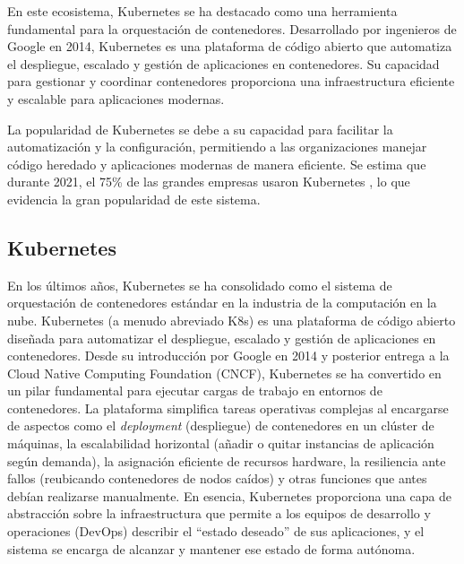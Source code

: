 \documentclass[12pt,twoside,titlepage]{report}
\begin{document}
En este ecosistema, Kubernetes se ha destacado como una herramienta fundamental para la orquestación de contenedores. Desarrollado por ingenieros de Google en 2014, Kubernetes es una plataforma de código abierto que automatiza el despliegue, escalado y gestión de aplicaciones en contenedores. Su capacidad para gestionar y coordinar contenedores proporciona una infraestructura eficiente y escalable para aplicaciones modernas. 

La popularidad de Kubernetes se debe a su capacidad para facilitar la automatización y la configuración, permitiendo a las organizaciones manejar código heredado y aplicaciones modernas de manera eficiente. Se estima que durante 2021, el 75\% de las grandes empresas usaron Kubernetes \cite{uso_kubernetes_grandes_empresas}, lo que evidencia la gran popularidad de este sistema.

\subsection{Kubernetes}
En los últimos años, Kubernetes se ha consolidado como el sistema de orquestación de contenedores estándar en la industria de la computación en la nube. Kubernetes (a menudo abreviado K8s) es una plataforma de código abierto diseñada para automatizar el despliegue, escalado y gestión de aplicaciones en contenedores. Desde su introducción por Google en 2014 y posterior entrega a la Cloud Native Computing Foundation (CNCF), Kubernetes se ha convertido en un pilar fundamental para ejecutar cargas de trabajo en entornos de contenedores. La plataforma simplifica tareas operativas complejas al encargarse de aspectos como el \textit{deployment} (despliegue) de contenedores en un clúster de máquinas, la escalabilidad horizontal (añadir o quitar instancias de aplicación según demanda), la asignación eficiente de recursos hardware, la resiliencia ante fallos (reubicando contenedores de nodos caídos) y otras funciones que antes debían realizarse manualmente. En esencia, Kubernetes proporciona una capa de abstracción sobre la infraestructura que permite a los equipos de desarrollo y operaciones (DevOps) describir el “estado deseado” de sus aplicaciones, y el sistema se encarga de alcanzar y mantener ese estado de forma autónoma. 
\end{document}
